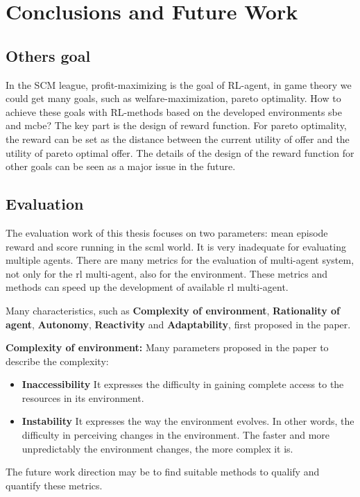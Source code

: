 \chapter{Conclusions and Future Work}

\section{Others goal}
In the SCM league, profit-maximizing is the goal of RL-agent, in game theory we could get many goals, such as welfare-maximization, pareto optimality. How to achieve these goals with RL-methods based on the developed environments \gls{sbe} and \gls{mcbe}? The key part is the design of reward function. For pareto optimality, the reward can be set as the distance between the current utility of offer and the utility of pareto optimal offer. The details of the design of the reward function for other goals can be seen as a major issue in the future.

\section{Evaluation}
The evaluation work of this thesis focuses on two parameters: mean episode reward and score running in the \gls{scml} world. It is very inadequate for evaluating multiple agents. There are many metrics for the evaluation of multi-agent system, not only for the \gls{rl} multi-agent, also for the environment. These metrics and methods can speed up the development of available \gls{rl} multi-agent. 

Many characteristics, such as \textbf{Complexity of environment}, \textbf{Rationality of agent}, \textbf{Autonomy}, \textbf{Reactivity} and \textbf{Adaptability}, first proposed in the paper\parencite{Bitonto2010}.

\textbf{Complexity of environment:} Many parameters proposed in the paper  to describe the complexity:
\begin{itemize}
\item \textbf{Inaccessibility} It expresses the difficulty in gaining complete access to the resources in its environment.
\item \textbf{Instability} It expresses the way the environment evolves. In other words, the difficulty in perceiving changes in the environment. The faster and more unpredictably the environment changes, the more complex it is.
\end{itemize}

The future work direction may be to find suitable methods to qualify and quantify these metrics.

